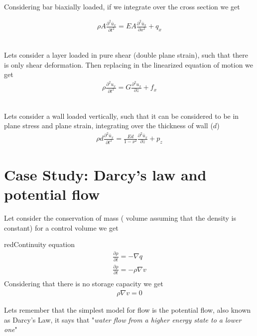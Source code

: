 \documentclass[a4paper, 11pt,article,oneside]{memoir}%
\begin{document}
{}\\
Considering bar biaxially loaded, if we integrate over the cross section we get

\begin{gather*}
\rho A\frac{\partial^2\bar{u}_x}{\partial t^2}=EA\frac{\partial^2 \bar{u}_x}{\partial x^2}+q_x
\end{gather*}


{}\\
Lets consider a layer loaded in pure shear (double plane strain), such that there is only shear deformation.
Then replacing in the linearized equation of motion we get 
\begin{gather*}
\rho \frac{\partial^2 u_x}{\partial t^2}=G\frac{\partial^2 u_x}{\partial z}+f_x
\end{gather*}


{}\\
Lets consider a wall loaded vertically, such that it can be considered to be in plane stress and plane strain, integrating over the thickness of wall ($d$)
\begin{gather*}
\rho d \frac{\partial^2 \bar{u}_x}{\partial t^2}=\frac{Ed}{1-\nu^2}\frac{\partial^2 \bar{u}_x}{\partial z}+p_z
\end{gather*}

\section{Case Study: Darcy's law and potential flow}
Let consider the conservation of mass ( volume assuming that the density is constant) for a control volume we get  
\begin{eqbox2}{red}{Continuity equation}
\begin{gather*}
\frac{\partial \rho}{\partial t}=-\nabla q\\
\frac{\partial \rho}{\partial t}=-\rho \nabla v\\
\end{gather*}
Considering that there is no storage capacity we get
\begin{gather*}
\rho \nabla v=0
\end{gather*}
\end{eqbox2}

Lets remember that the simplest model for flow is the potential flow, also known as Darcy's Law, it says that "\textit{water flow from a higher energy state to a lower one}"
\end{document}
